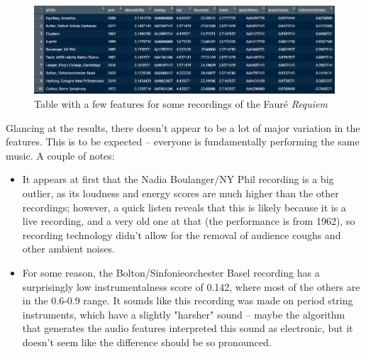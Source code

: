 \documentclass{article}
\begin{document}
\begin{figure}[h]
	\centering
	\includegraphics[width=\textwidth]{screenshot_faure.jpg}
	\caption{Table with a few features for some recordings of the Faur\'e \textit{Requiem}}
\end{figure}

Glancing at the results, there doesn't appear to be a lot of major variation in the features. This is to be expected -- everyone is fundamentally performing the same music. A couple of notes:

\begin{itemize}
	
\item It appears at first that the Nadia Boulanger/NY Phil recording is a big outlier, as its loudness and energy scores are much higher than the other recordings; however, a quick listen reveals that this is likely because it is a live recording, and a very old one at that (the performance is from 1962), so recording technology didn't allow for the removal of audience coughs and other ambient noises.

\item For some reason, the Bolton/Sinfonieorchester Basel recording has a surprisingly low instrumentalness score of 0.142, where most of the others are in the 0.6-0.9 range. It sounds like this recording was made on period string instruments, which have a slightly "harsher" sound -- maybe the algorithm that generates the audio features interpreted this sound as electronic, but it doesn't seem like the difference should be so pronounced.

\end{itemize}
\end{document}
